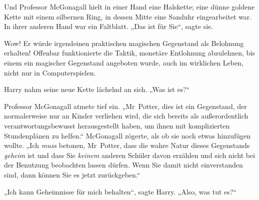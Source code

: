 Und Professor McGonagall hielt in einer Hand eine Halskette; eine dünne goldene Kette mit einem silbernen Ring, in dessen Mitte eine Sanduhr eingearbeitet war. In ihrer anderen Hand war ein Faltblatt. „Das ist für Sie“, sagte sie.

Wow! Er würde irgendeinen praktischen magischen Gegenstand als Belohnung erhalten! Offenbar funktionierte die Taktik, monetäre Entlohnung abzulehnen, bis einem ein magischer Gegenstand angeboten wurde, auch im wirklichen Leben, nicht nur in Computerspielen.

Harry nahm seine neue Kette lächelnd an sich. „Was ist es?“

Professor McGonagall atmete tief ein. „Mr~Potter, dies ist ein Gegenstand, der normalerweise nur an Kinder verliehen wird, die sich bereits als außerordentlich verantwortungsbewusst herausgestellt haben, um ihnen mit komplizierten Stundenplänen zu helfen.“ McGonagall zögerte, als ob sie noch etwas hinzufügen wollte. „Ich \emph{muss} betonen, Mr~Potter, dass die wahre Natur dieses Gegenstands \emph{geheim} ist und dass Sie \emph{keinem} anderen Schüler davon erzählen und sich nicht bei der Benutzung beobachten lassen dürfen. Wenn Sie damit nicht einverstanden sind, dann können Sie es jetzt zurückgeben.“

„Ich kann Geheimnisse für mich behalten“, sagte Harry. „Also, was tut es?“

